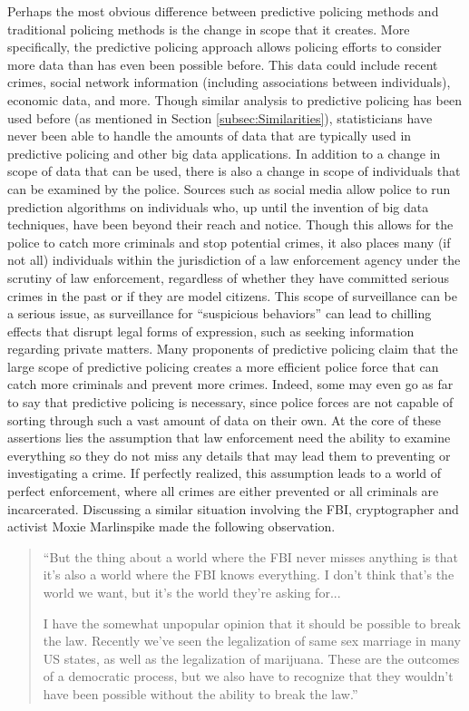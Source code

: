 \documentclass[12pt]{article} %
\begin{document}
Perhaps the most obvious difference between predictive policing methods and traditional policing methods is the change in scope that it creates. More specifically, the predictive policing approach allows policing efforts to consider more data than has even been possible before. This data could include recent crimes, social network information (including associations between individuals), economic data, and more. Though similar analysis to predictive policing has been used before (as mentioned in Section \ref{subsec:Similarities}), statisticians have never been able to handle the amounts of data that are typically used in predictive policing and other big data applications. In addition to a change in scope of data that can be used, there is also a change in scope of individuals that can be examined by the police. Sources such as social media allow police to run prediction algorithms on individuals who, up until the invention of big data techniques, have been beyond their reach and notice. Though this allows for the police to catch more criminals and stop potential crimes, it also places many (if not all) individuals within the jurisdiction of a law enforcement agency under the scrutiny of law enforcement, regardless of whether they have committed serious crimes in the past or if they are model citizens. This scope of surveillance can be a serious issue, as surveillance for ``suspicious behaviors'' can lead to chilling effects that disrupt legal forms of expression, such as seeking information regarding private matters. \cite{penney2016chilling} Many proponents of predictive policing claim that the large scope of predictive policing creates a more efficient police force that can catch more criminals and prevent more crimes. \cite{pearsall2010predictive} Indeed, some may even go as far to say that predictive policing is necessary, since police forces are not capable of sorting through such a vast amount of data on their own. At the core of these assertions lies the assumption that law enforcement need the ability to examine everything so they do not miss any details that may lead them to preventing or investigating a crime. If perfectly realized, this assumption leads to a world of perfect enforcement, where all crimes are either prevented or all criminals are incarcerated. Discussing a similar situation involving the FBI, cryptographer and activist Moxie Marlinspike made the following observation. \cite{rosenblum_2016}

\begin{quote}
``But the thing about a world where the FBI never misses anything is that it's also a world where the FBI knows everything. I don't think that's the world we want, but it's the world they're asking for...

I have the somewhat unpopular opinion that it should be possible to break the law. Recently we've seen the legalization of same sex marriage in many US states, as well as the legalization of marijuana. These are the outcomes of a democratic process, but we also have to recognize that they wouldn't have been possible without the ability to break the law.''
\end{quote}
\end{document}

